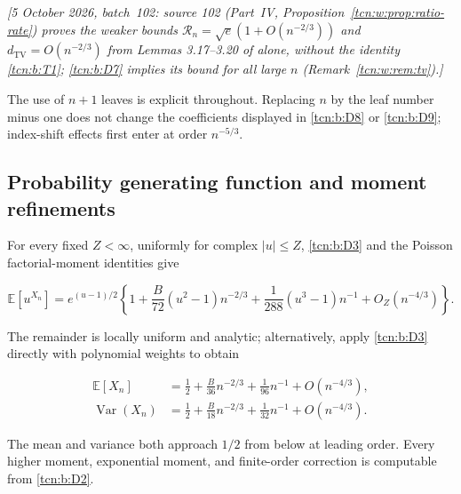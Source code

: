 \documentclass[11pt,letterpaper]{article}
\theoremstyle{remark}
\begin{document}
\emph{[5 October 2026, batch~102: source 102 (Part~IV, Proposition~\ref{tcn:w:prop:ratio-rate}) proves the weaker bounds $\mathcal R_n=\sqrt e(1+O(n^{-2/3}))$ and $d_{\mathrm{TV}}=O(n^{-2/3})$ from Lemmas 3.17--3.20 of \cite{Chang2024} alone, without the identity \eqref{tcn:b:T1}; \eqref{tcn:b:D7} implies its bound for all large $n$ (Remark~\ref{tcn:w:rem:tv}).]}

The use of \(n+1\) leaves is explicit throughout. Replacing \(n\) by the
leaf number minus one does not change the coefficients displayed in \eqref{tcn:b:D8}
or \eqref{tcn:b:D9}; index-shift effects first enter at order \(n^{-5/3}\).

\subsection{Probability generating function and moment
refinements}\label{tcn:b:probability-generating-function-and-moment-refinements}

For every fixed \(Z<\infty\), uniformly for complex \(|u|\le Z\), \eqref{tcn:b:D3}
and the Poisson factorial-moment identities give

\[
 \mathbb E[u^{X_n}]
 =e^{(u-1)/2}\left\{
  1+\frac B{72}(u^2-1)n^{-2/3}
    +\frac1{288}(u^3-1)n^{-1}
    +O_Z(n^{-4/3})\right\}.                                \tag{D13}\label{tcn:b:D13}
\]

The remainder is locally uniform and analytic; alternatively, apply \eqref{tcn:b:D3}
directly with polynomial weights to obtain

\[
 \begin{aligned}
 \mathbb E[X_n]
  &=\frac12+\frac B{36}n^{-2/3}+\frac1{96}n^{-1}
                      +O(n^{-4/3}),\\
 \operatorname{Var}(X_n)
  &=\frac12+\frac B{18}n^{-2/3}+\frac1{32}n^{-1}
                      +O(n^{-4/3}).
 \end{aligned}                                               \tag{D14}\label{tcn:b:D14}
\]

The mean and variance both approach \(1/2\) from below at leading order.
Every higher moment, exponential moment, and finite-order correction is
computable from \eqref{tcn:b:D2}.
\end{document}
